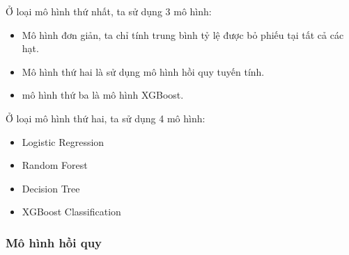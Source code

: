 \documentclass[14pt, a4paper]{article}
\numberwithin{equation}{section}
\numberwithin{figure}{section}
\numberwithin{dl}{section}
\numberwithin{md}{section}
\numberwithin{bd}{section}
\numberwithin{dn}{section}
\numberwithin{hq}{section}
\begin{document}
    Ở loại mô hình thứ nhất, ta sử dụng 3 mô hình:

    \begin{itemize}
        \item Mô hình đơn giản, ta chỉ tính trung bình tỷ lệ được bỏ phiếu tại tất cả các hạt.
        \item Mô hình thứ hai là sử dụng mô hình hồi quy tuyến tính.
        \item mô hình thứ ba là mô hình XGBoost.
    \end{itemize}

    Ở loại mô hình thứ hai, ta sử dụng 4 mô hình:

    \begin{itemize}
        \item Logistic Regression
        \item Random Forest
        \item Decision Tree
        \item XGBoost Classification
    \end{itemize}

    \subsubsection{Mô hình hồi quy}
\end{document}
